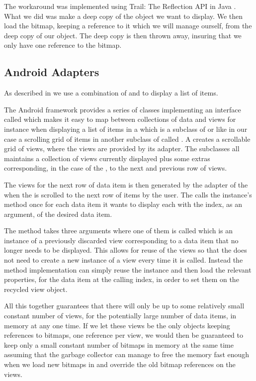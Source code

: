 The workaround was implemented using Trail: The Reflection API in Java \parencite{java_trail_reflection}. What we did was make a deep copy of the  object we want to display. We then load the bitmap, keeping a reference to it which we will manage ourself, from the deep copy of our object. The deep copy is then thrown away, insuring that we only have one reference to the bitmap.

\subsection{Android Adapters}

As described in  we use a combination of  and  to display a list of items.

The Android framework provides a series of classes implementing an interface called  which makes it easy to map between collections of data and views for instance when displaying a list of items in a  which is a subclass of  or like in our case a scrolling grid of items in another subclass of  called . A  creates a scrollable grid of views, where the views are provided by its adapter. The  subclasses all maintains a collection of views currently displayed plus some extras corresponding, in the case of the , to the next and previous row of views. 

The views for the next row of data item is then generated by the adapter of the  when the  is scrolled to the next row of items by the user. The  calls the  instance's  method once for each data item it wants to display each with the index, as an argument, of the desired data item.

The  method takes three arguments where one of them is called  which is an instance of a previously discarded view corresponding to a data item that no longer needs to be displayed. This allows for reuse of the views so that the  does not need to create a new instance of a view every time it is called. Instead the  method implementation can simply reuse the   instance and then load the relevant properties, for the data item at the calling index, in order to set them on the recycled view object.  

All this together guarantees that there will only be up to some relatively small constant number of views, for the potentially large number of data items, in memory at any one time. If we let these views be the only objects keeping references to bitmaps, one reference per view, we would then be guaranteed to keep only a small constant number of bitmaps in memory at the same time assuming that the garbage collector can manage to free the memory fast enough when we load new bitmaps in and override the old bitmap references on the views. 
